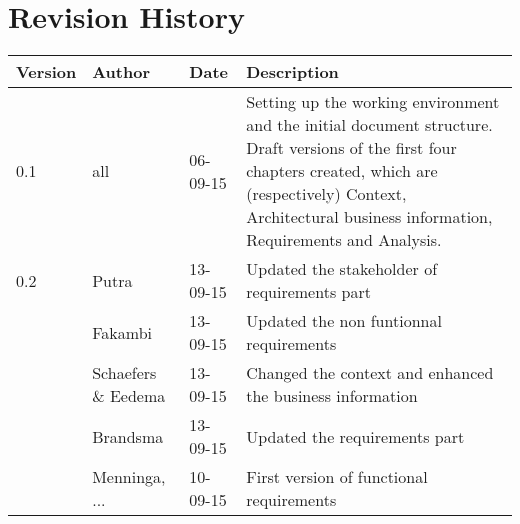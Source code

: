 \section*{Revision History}
\begin{longtable}{L{} L{} L{} L{}}
	\textbf{Version} & \textbf{Author}       & \textbf{Date} & \textbf{Description}                                                                                                                                                                                                       \\ \endhead
			
	\toprule
	0.1              & all                   & 06-09-15      & Setting up the working environment and the initial document structure. Draft versions of the first four chapters created, which are (respectively) Context, Architectural business information, Requirements and Analysis. \\
	\midrule
			
	0.2              & Putra                 & 13-09-15      & Updated the stakeholder of requirements part                                                                                                                                                                               \\
					 & Fakambi 				& 13-09-15  	 & Updated the non funtionnal requirements \\
					 & Schaefers \& Eedema   & 13-09-15      & Changed the context and enhanced the business information                                                                                                                                                                  \\
					 & Brandsma              & 13-09-15      & Updated the requirements part                                                                                                                                                                                              \\  
					 & Menninga, ...         & 10-09-15      & First version of functional requirements                                                                                                                                                                                   \\ 	                 
	\midrule
			

\end{longtable}
